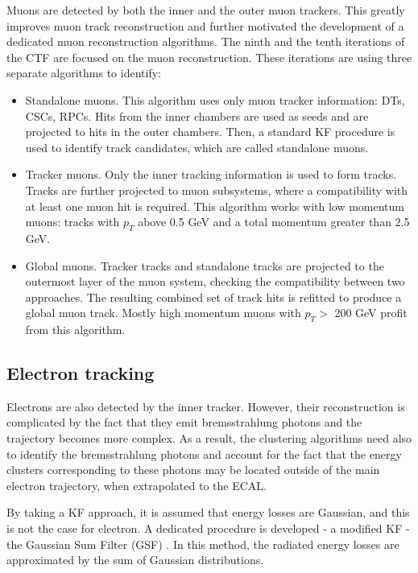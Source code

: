 Muons are detected by both the inner and the outer muon trackers. This greatly improves muon track reconstruction and further motivated the development of a dedicated muon reconstruction algorithms. The ninth and the tenth iterations of the CTF are focused on the muon reconstruction. These iterations are using three separate algorithms to identify: 

\begin{itemize}
\item Standalone muons. This algorithm uses only muon tracker information: DTs, CSCs, RPCs. Hits from the inner chambers are used as seeds and are projected to hits in the outer chambers. Then, a standard KF procedure is used to identify track candidates, which are called standalone muons.
\item Tracker muons. Only the inner tracking information is used to form tracks. Tracks are further projected to muon subsystems, where a compatibility with at least one muon hit is required. This algorithm works with low momentum muons: tracks with $p_T$ above 0.5 GeV and a total momentum greater than 2.5 GeV.
\item Global muons. Tracker tracks and standalone tracks are projected to the outermost layer of the muon system, checking the compatibility between two approaches. The resulting combined set of track hits is refitted to produce a global muon track. Mostly high momentum muons with $p_T > $ 200 GeV profit from this algorithm.
\end{itemize}

\subsection{Electron tracking}\label{sec:ele_track_reconstruction}
Electrons are also detected by the inner tracker. However, their reconstruction is complicated by the fact that they emit bremsstrahlung photons and the trajectory becomes more complex. As a result, the clustering algorithms need also to identify the bremsstrahlung photons and account for the fact that the energy clusters corresponding to these photons may be located outside of the main electron trajectory, when extrapolated to the ECAL. 

By taking a KF approach, it is assumed that energy losses are Gaussian, and this is not the case for electron. A dedicated procedure is developed - a modified KF - the Gaussian Sum Filter (GSF) \cite{GSF}. In this method, the radiated energy losses are approximated by the sum of Gaussian distributions. 

